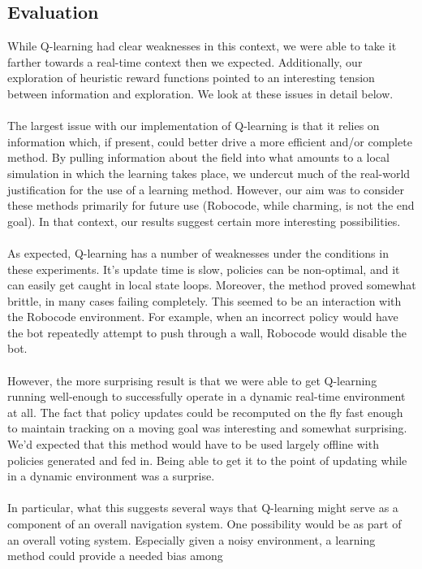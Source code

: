 \documentclass{aiaa-tc}%
\begin{document}
\subsection{Evaluation}
While Q-learning had clear weaknesses in this context, we were able to take it farther towards a real-time context then we expected. Additionally, our exploration of heuristic reward functions pointed to an interesting tension between information and exploration. We look at these issues in detail below. \\ \\
The largest issue with our implementation of Q-learning is that it
relies on information which, if present, could better drive a more
efficient and/or complete method. By pulling information about the
field into what amounts to a local simulation in which the learning
takes place, we undercut much of the real-world justification for the
use of a learning method. However, our aim was to consider these
methods primarily for future use (Robocode, while charming, is not the
end goal). In that context, our results suggest certain
more interesting possibilities. \\ \\
As expected, Q-learning has a number of weaknesses under the conditions in these experiments. It's update time is
slow, policies can be non-optimal, and it can easily get caught in
local state loops. Moreover, the method proved somewhat brittle, in
many cases failing completely. This seemed to be an interaction with
the Robocode environment. For example, when an incorrect policy would
have the bot repeatedly attempt to push through a wall, Robocode would
disable the bot. \\ \\
However, the more surprising
result is that we were able to get Q-learning running well-enough to
successfully operate in a dynamic real-time environment at all. The
fact that policy updates could be recomputed on the fly fast enough to
maintain tracking on a moving goal was interesting and somewhat
surprising. We'd expected that this method would have to be used
largely offline with policies generated and fed in. Being able to get
it to the point of updating while in a dynamic environment was a surprise. \\ \\
In particular, what this suggests several ways that Q-learning might serve as a
component of an overall navigation system. One possibility would be as
part of an overall voting system. Especially given a noisy
environment, a learning method could provide a needed bias among
\end{document}
